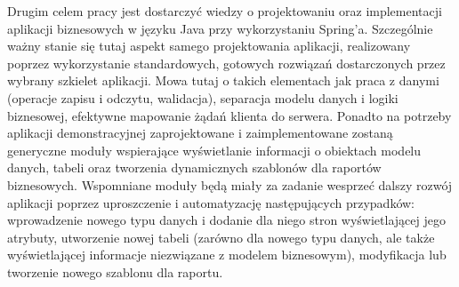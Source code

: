 	Drugim celem pracy jest dostarczyć wiedzy o projektowaniu oraz implementacji aplikacji biznesowych w języku Java przy wykorzystaniu Spring'a. Szczególnie ważny stanie się tutaj aspekt samego projektowania aplikacji, realizowany poprzez wykorzystanie standardowych, gotowych rozwiązań dostarczonych przez wybrany szkielet aplikacji. Mowa tutaj o takich elementach jak praca z danymi (operacje zapisu i odczytu, walidacja), separacja modelu danych i logiki biznesowej, efektywne mapowanie żądań klienta do serwera.
	Ponadto na potrzeby aplikacji demonstracyjnej zaprojektowane i zaimplementowane zostaną generyczne moduły wspierające wyświetlanie informacji o obiektach modelu danych, tabeli oraz tworzenia dynamicznych szablonów dla raportów biznesowych. Wspomniane moduły będą miały za zadanie wesprzeć dalszy rozwój aplikacji poprzez uproszczenie i automatyzację następujących przypadków: wprowadzenie nowego typu danych i dodanie dla niego stron wyświetlającej jego atrybuty, utworzenie nowej tabeli (zarówno dla nowego typu danych, ale także wyświetlającej informacje niezwiązane z modelem biznesowym), modyfikacja lub tworzenie nowego szablonu dla raportu. 
